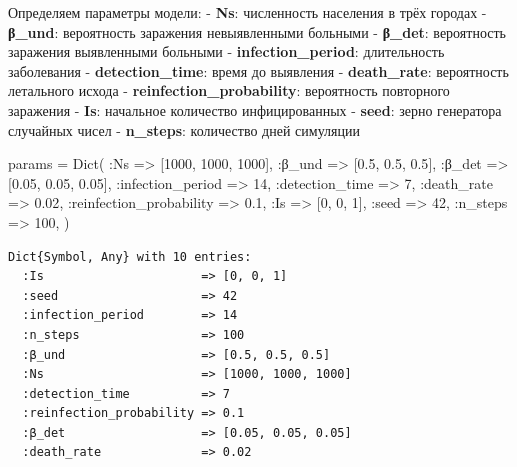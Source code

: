 \documentclass[
  12pt,
  a4paper,
  DIV=11,
  numbers=noendperiod]{scrreprt}
\newenvironment{Shaded}{\begin{snugshade}}{\end{snugshade}}
\newcommand{\FloatTok}[1]{\textcolor[rgb]{0.68,0.00,0.00}{#1}}
\newcommand{\FunctionTok}[1]{\textcolor[rgb]{0.28,0.35,0.67}{#1}}
\newcommand{\NormalTok}[1]{\textcolor[rgb]{0.00,0.23,0.31}{#1}}
\newcommand{\OperatorTok}[1]{\textcolor[rgb]{0.37,0.37,0.37}{#1}}
\begin{document}
Определяем параметры модели: - \textbf{Ns}: численность населения в трёх
городах - \textbf{β\_und}: вероятность заражения невыявленными больными
- \textbf{β\_det}: вероятность заражения выявленными больными -
\textbf{infection\_period}: длительность заболевания -
\textbf{detection\_time}: время до выявления - \textbf{death\_rate}:
вероятность летального исхода - \textbf{reinfection\_probability}:
вероятность повторного заражения - \textbf{Is}: начальное количество
инфицированных - \textbf{seed}: зерно генератора случайных чисел -
\textbf{n\_steps}: количество дней симуляции

\begin{Shaded}
\begin{Highlighting}[]
\NormalTok{params }\OperatorTok{=} \FunctionTok{Dict}\NormalTok{(}
    \OperatorTok{:}\NormalTok{Ns }\OperatorTok{=\textgreater{}}\NormalTok{ [}\FloatTok{1000}\NormalTok{, }\FloatTok{1000}\NormalTok{, }\FloatTok{1000}\NormalTok{],}
    \OperatorTok{:}\NormalTok{β\_und }\OperatorTok{=\textgreater{}}\NormalTok{ [}\FloatTok{0.5}\NormalTok{, }\FloatTok{0.5}\NormalTok{, }\FloatTok{0.5}\NormalTok{],}
    \OperatorTok{:}\NormalTok{β\_det }\OperatorTok{=\textgreater{}}\NormalTok{ [}\FloatTok{0.05}\NormalTok{, }\FloatTok{0.05}\NormalTok{, }\FloatTok{0.05}\NormalTok{],}
    \OperatorTok{:}\NormalTok{infection\_period }\OperatorTok{=\textgreater{}} \FloatTok{14}\NormalTok{,}
    \OperatorTok{:}\NormalTok{detection\_time }\OperatorTok{=\textgreater{}} \FloatTok{7}\NormalTok{,}
    \OperatorTok{:}\NormalTok{death\_rate }\OperatorTok{=\textgreater{}} \FloatTok{0.02}\NormalTok{,}
    \OperatorTok{:}\NormalTok{reinfection\_probability }\OperatorTok{=\textgreater{}} \FloatTok{0.1}\NormalTok{,}
    \OperatorTok{:}\NormalTok{Is }\OperatorTok{=\textgreater{}}\NormalTok{ [}\FloatTok{0}\NormalTok{, }\FloatTok{0}\NormalTok{, }\FloatTok{1}\NormalTok{],}
    \OperatorTok{:}\NormalTok{seed }\OperatorTok{=\textgreater{}} \FloatTok{42}\NormalTok{,}
    \OperatorTok{:}\NormalTok{n\_steps }\OperatorTok{=\textgreater{}} \FloatTok{100}\NormalTok{,}
\NormalTok{)}
\end{Highlighting}
\end{Shaded}

\begin{verbatim}
Dict{Symbol, Any} with 10 entries:
  :Is                      => [0, 0, 1]
  :seed                    => 42
  :infection_period        => 14
  :n_steps                 => 100
  :β_und                   => [0.5, 0.5, 0.5]
  :Ns                      => [1000, 1000, 1000]
  :detection_time          => 7
  :reinfection_probability => 0.1
  :β_det                   => [0.05, 0.05, 0.05]
  :death_rate              => 0.02
\end{verbatim}
\end{document}
